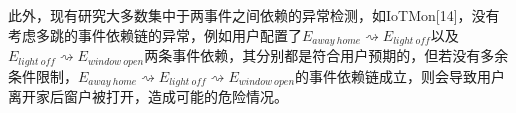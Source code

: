 此外，现有研究大多数集中于两事件之间依赖的异常检测，如IoTMon[14]，没有考虑多跳的事件依赖链的异常，例如用户配置了$E_{away\ home}\rightsquigarrow E_{light\ off}$以及$E_{light\ off}\rightsquigarrow E_{window\ open}$两条事件依赖，其分别都是符合用户预期的，但若没有多余条件限制，$E_{away\ home}\rightsquigarrow E_{light\ off}\rightsquigarrow E_{window\ open}$的事件依赖链成立，则会导致用户离开家后窗户被打开，造成可能的危险情况。

